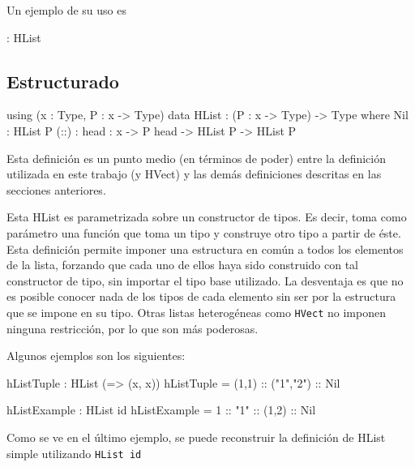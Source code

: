 Un ejemplo de su uso es

\begin{code}
[1,"2"] : HList
\end{code}

\subsection{Estructurado}

\begin{code}
using (x : Type, P : x -> Type)        
    data HList : (P : x -> Type) ->  Type where
        Nil : HList P
        (::) : {head : x} -> P head -> HList P -> HList P 
\end{code}

Esta definición es un punto medio (en términos de poder) entre la definición utilizada en este trabajo (y HVect) y las demás definiciones descritas en las secciones anteriores.

Esta HList es parametrizada sobre un constructor de tipos. Es decir, toma como parámetro una función que toma un tipo y construye otro tipo a partir de éste. Esta definición permite imponer una estructura en común a todos los elementos de la lista, forzando que cada uno de ellos haya sido construido con tal constructor de tipo, sin importar el tipo base utilizado.
La desventaja es que no es posible conocer nada de los tipos de cada elemento sin ser por la estructura que se impone en su tipo. Otras listas heterogéneas como \texttt{HVect} no imponen ninguna restricción, por lo que son más poderosas.

Algunos ejemplos son los siguientes:

\begin{code}
hListTuple : HList (\x => (x, x))
hListTuple = (1,1) :: ("1","2") :: Nil

hListExample : HList id
hListExample = 1 :: "1" :: (1,2) :: Nil
\end{code}

Como se ve en el último ejemplo, se puede reconstruir la definición de HList simple utilizando \texttt{HList id}
